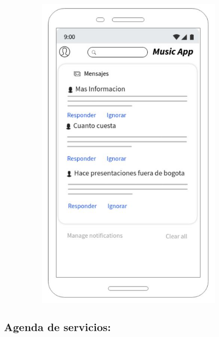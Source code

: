 \begin{figure}[hbt!]
 \centering
\includegraphics[width=12cm, height=16cm,keepaspectratio=true]{Desarrollo/Interfaces/Mockup/imgs/wire4.JPG}
\end{figure}
\newpage
\subsection{Agenda de servicios:}

